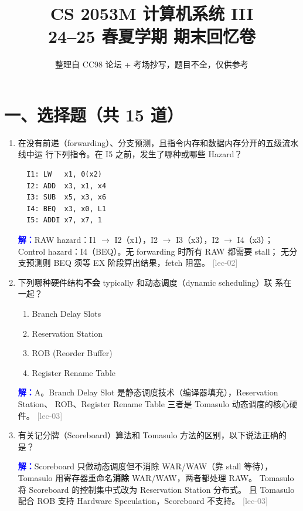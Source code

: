 \documentclass[11pt,a4paper]{article}
\title{CS 2053M 计算机系统 III\\24--25 春夏学期 期末回忆卷}
\author{整理自 CC98 论坛 + 考场抄写，题目不全，仅供参考}
\date{}
\newcommand{\lec}[1]{\textcolor{gray}{[lec-#1]}}
\newcommand{\ans}{\par\noindent\textcolor{blue}{\textbf{解：}}}
\begin{document}
\maketitle

\section*{一、选择题（共 15 道）}

\begin{enumerate}[leftmargin=*,itemsep=8pt]

\item 在没有前递（forwarding）、分支预测，且指令内存和数据内存分开的五级流水线中运
  行下列指令。在 I5 之前，发生了哪种或哪些 Hazard？

  \begin{verbatim}
  I1: LW   x1, 0(x2)
  I2: ADD  x3, x1, x4
  I3: SUB  x5, x3, x6
  I4: BEQ  x3, x0, L1
  I5: ADDI x7, x7, 1
  \end{verbatim}

  \ans RAW hazard：I1 $\to$ I2（x1），I2 $\to$ I3（x3），I2 $\to$ I4（x3）；
  Control hazard：I4（BEQ）。无 forwarding 时所有 RAW 都需要 stall；
  无分支预测则 BEQ 须等 EX 阶段算出结果，fetch 阻塞。 \lec{02}

\item 下列哪种硬件结构\textbf{不会} typically 和动态调度（dynamic scheduling）联
  系在一起？

  \begin{enumerate}[label=\Alph*.]
    \item Branch Delay Slots
    \item Reservation Station
    \item ROB (Reorder Buffer)
    \item Register Rename Table
  \end{enumerate}

  \ans A。Branch Delay Slot 是静态调度技术（编译器填充），Reservation Station、
  ROB、Register Rename Table 三者是 Tomasulo 动态调度的核心硬件。 \lec{03}

\item 有关记分牌（Scoreboard）算法和 Tomasulo 方法的区别，以下说法正确的是？

  \ans Scoreboard 只做动态调度但不消除 WAR/WAW（靠 stall 等待），
  Tomasulo 用寄存器重命名\textbf{消除} WAR/WAW，两者都处理 RAW。
  Tomasulo 将 Scoreboard 的控制集中式改为 Reservation Station 分布式。
  且 Tomasulo 配合 ROB 支持 Hardware Speculation，Scoreboard 不支持。 \lec{03}


\end{enumerate}
\end{document}
